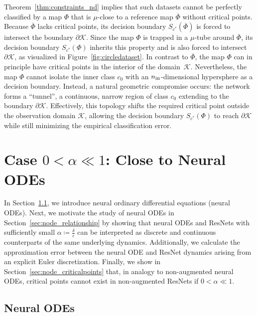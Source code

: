 \documentclass[10pt]{article}
\theoremstyle{definition}
\numberwithin{equation}{section}
\newcommand{\eps}{\varepsilon}
\newcommand*{\nin}{n_\textup{in}}
\begin{document}
Theorem~\ref{thm:constraints_nd} implies that such datasets cannot be perfectly classified by a map $\Phi$ that is $\mu$-close to a reference map $\overline{\Phi}$ without critical points. Because $\overline{\Phi}$ lacks critical points, its decision boundary $S_{c^\ast}(\overline{\Phi})$ is forced to intersect the boundary $\partial \mathcal{K}$. Since the map $\Phi$ is trapped in a $\mu$-tube around $\overline{\Phi}$, its decision boundary $S_{c^\ast}(\Phi)$ inherits this property and is also forced to intersect $\partial \mathcal{K}$, as visualized in Figure~\ref{fig:circledataset}. In contrast to $\overline{\Phi}$, the map $\Phi$ can in principle have critical points in the interior of the domain~$\mathcal{K}$. Nevertheless, the map $\Phi$ cannot isolate the inner class $c_0$ with an $\nin$-dimensional hypersphere as a decision boundary. Instead, a natural geometric compromise occurs: the network forms a ``tunnel'', a continuous, narrow region of class $c_0$ extending to the boundary $\partial \mathcal{K}$. Effectively, this topology shifts the required critical point outside the observation domain $\mathcal{K}$, allowing the decision boundary $S_{c^\ast}(\Phi)$ to reach $\partial \mathcal{K}$ while still minimizing the empirical classification error.


\section{Case $0<\alpha \ll 1$: Close to Neural ODEs}
\label{sec:node}

In Section~\ref{sec:node_model}, we introduce neural ordinary differential equations (neural ODEs). Next, we motivate the study of neural ODEs in Section~\ref{sec:node_relationship} by showing that neural ODEs and ResNets with sufficiently small $\alpha \coloneqq \frac{\delta}{\eps}$ can be interpreted as discrete and continuous counterparts of the same underlying dynamics. Additionally, we calculate the approximation error between the neural ODE and ResNet dynamics arising from an explicit Euler discretization. Finally, we show in Section~\ref{sec:node_criticalpoints} that, in analogy to non-augmented neural ODEs, critical points cannot exist in non-augmented ResNets if $0 < \alpha \ll 1$.

\subsection{Neural ODEs}
\label{sec:node_model}
\end{document}
